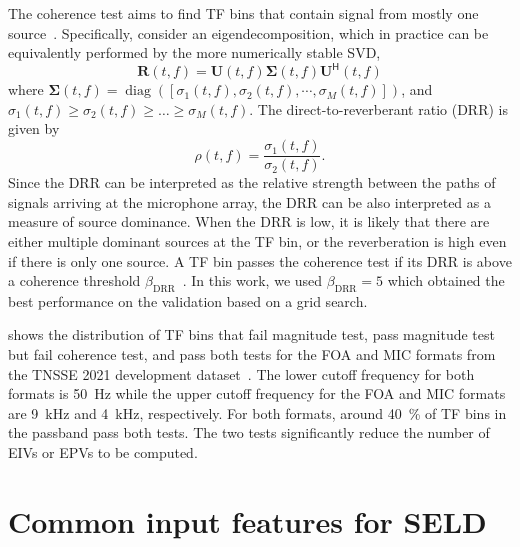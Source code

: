 \documentclass[journal]{IEEEtran}
\renewcommand{\H}{\mathsf{H}}
\begin{document}
The coherence test aims to find TF bins that contain signal from mostly one source~\cite{Mohan2008LocalizationTest}. Specifically, consider an eigendecomposition, which in practice can be equivalently performed by the more numerically stable SVD,
\begin{equation}
    \mathbf{R}(t,f) = \mathbf{U}(t,f)\mathbf{\Sigma}(t,f)\mathbf{U}^\H(t,f)
\end{equation}
where $\mathbf{\Sigma}(t,f)=\operatorname{diag}\left([\sigma_1(t,f), \sigma_2(t,f),\cdots,\sigma_M(t,f)]\right)$, and $\sigma_1(t,f)\ge\sigma_2(t,f)\ge\dots\ge\sigma_M(t,f)$. The direct-to-reverberant ratio (DRR) is given by
\begin{equation}
    \rho(t,f) = \dfrac{\sigma_1(t,f)}{\sigma_2(t,f)}.
\end{equation}
Since the DRR can be interpreted as the relative strength between the paths of signals arriving at the microphone array, the DRR can be also interpreted as a measure of source dominance. When the DRR is low, it is likely that there are either multiple dominant sources at the TF bin, or the reverberation is high even if there is only one source.
A TF bin passes the coherence test if its DRR is above a coherence threshold $\beta_\text{DRR}$~\cite{Rafaely2017SpeakerStatistics}. In this work, we used $\beta_\text{DRR}=5$ which obtained the best performance on the validation based on a grid search. 

 shows the distribution of TF bins that fail magnitude test, pass magnitude test but fail coherence test, and pass both tests for the FOA and MIC formats from the TNSSE 2021 development dataset~\cite{Politis2021}. The lower cutoff frequency for both formats is \SI{50}{\hertz} while the upper cutoff frequency for the FOA and MIC formats are \SI{9}{\kilo\hertz} and \SI{4}{\kilo\hertz}, respectively. For both formats, around \SI{40}{\percent} of TF bins in the passband pass both tests. The two tests significantly reduce the number of EIVs or EPVs to be computed.  \section{Common input features for SELD}
\label{sec:common_features}
\end{document}
